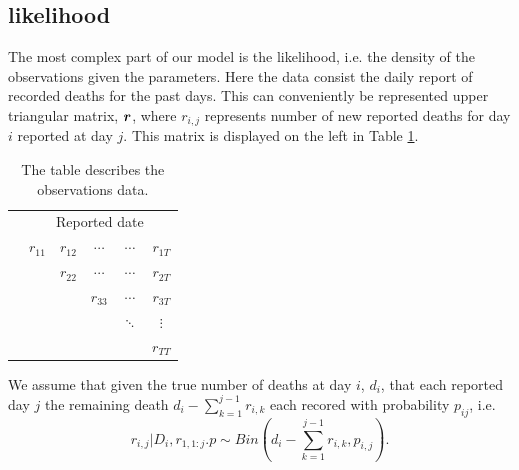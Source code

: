 \subsection{likelihood}
The most complex part of our model is the likelihood, i.e. the density of the observations given the parameters. Here the data consist the daily report of recorded deaths for the past days. This can conveniently be represented upper triangular matrix, ${\boldsymbol{r}}$, where $r_{i,j}$ represents number of new reported deaths for day $i$ reported at day $j$. This matrix is displayed on the left in Table \ref{tab:Data}.

\begin{table}
	\centering
	\begin{tabular}{cccccc}
		\multicolumn{1}{c}{} & \multicolumn{5}{c}{Reported date}                                             \\
		\parbox[t]{2mm}{}   & $r_{11}$ & $r_{12}$ & $\cdots$ &$\cdots$  &  $r_{1T}$\\
		& & $r_{22}$ &  $\cdots$ & $\cdots$   &$r_{2T}$ \\
		& & &$r_{33}$ &  $\cdots$ &  $r_{3T}$ \\
		& & & &  $\ddots$ & $\vdots$  \\
		& & & &  &  $r_{TT}$ \\

	\end{tabular}

	\caption{The table describes the observations data.}
	\label{tab:Data}
\end{table}

 We assume that given the true number of deaths at day $i$, $d_i$, that each reported day $j$ the remaining death $d_i - \sum_{k=1}^{j-1}r_{i,k}$ each recored with probability $p_{ij}$, i.e. $$r_{i,j}|D_i,r_{1,1:j}.p \sim Bin(d_i - \sum_{k=1}^{j-1}r_{i,k}, p_{i,j}).$$

